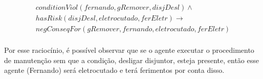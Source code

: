 \begin{eqnarray}\label{applicationCodViolIntrodCase}\nonumber
	conditionViol(fernando,gRemover,disjDesl)  \wedge \\
	hasRisk(disjDesl, eletrocutado, ferEletr) \to \nonumber \\ 
	negConseqFor(gRemover,fernando,eletrocutado,ferEletr) \nonumber \\ 
\end{eqnarray}	

Por esse raciocínio, é possível observar que se o agente executar o procedimento de manutenção sem que a condição, desligar disjuntor, esteja presente, então esse agente (Fernando) será eletrocutado e terá ferimentos por conta disso. 